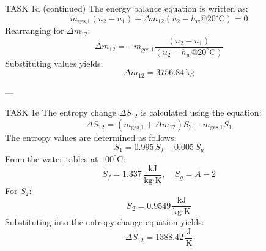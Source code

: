 TASK 1d (continued)  
The energy balance equation is written as:  
\[
m_{\text{ges,1}} (u_2 - u_1) + \Delta m_{12} (u_2 - h_w@20^\circ\text{C}) = 0
\]  
Rearranging for \( \Delta m_{12} \):  
\[
\Delta m_{12} = -m_{\text{ges,1}} \frac{(u_2 - u_1)}{(u_2 - h_w@20^\circ\text{C})}
\]  
Substituting values yields:  
\[
\Delta m_{12} = 3756.84 \, \text{kg}
\]  

---

TASK 1e  
The entropy change \( \Delta S_{12} \) is calculated using the equation:  
\[
\Delta S_{12} = (m_{\text{ges,1}} + \Delta m_{12}) S_2 - m_{\text{ges,1}} S_1
\]  
The entropy values are determined as follows:  
\[
S_1 = 0.995 \, S_f + 0.005 \, S_g
\]  
From the water tables at \( 100^\circ\text{C} \):  
\[
S_f = 1.337 \, \frac{\text{kJ}}{\text{kg·K}}, \quad S_g = A-2
\]  
For \( S_2 \):  
\[
S_2 = 0.9549 \, \frac{\text{kJ}}{\text{kg·K}}
\]  
Substituting into the entropy change equation yields:  
\[
\Delta S_{12} = 1388.42 \, \frac{\text{J}}{\text{K}}
\]